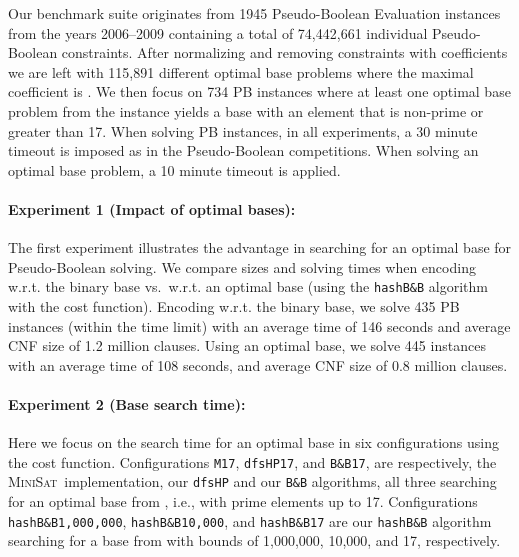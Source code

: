 \documentclass[envcountsame]{llncs}
\newcommand\minisatp{\textsc{MiniSat}}
\begin{document}
Our benchmark suite originates from 1945 Pseudo-Boolean Evaluation
\cite{Manquinho06}
instances from the years 2006--2009 containing a total of 
74,442,661 individual Pseudo-Boolean constraints. After 
normalizing and removing constraints with  coefficients we
are left with 115,891 different optimal base problems where the
maximal coefficient is .
We then focus on 734
PB instances where at least one optimal base
problem from the instance yields a base with an element that is
non-prime or greater than 17.
When solving PB instances, in all experiments, a 30 minute timeout is
imposed as in the Pseudo-Boolean competitions. When solving an optimal
base problem, a 10 minute timeout is applied.


\paragraph{Experiment 1 (Impact of optimal bases):}

The first experiment illustrates the advantage in searching for an
optimal base for Pseudo-Boolean solving. We compare sizes and
solving times when encoding w.r.t. the binary base vs.\ w.r.t. an optimal base
(using the \texttt{hashB\&B} algorithm with the  cost
function).
Encoding w.r.t. the binary base, we solve 435 PB instances (within the
time limit) with an average time of 146 seconds and average CNF size
of 1.2 million clauses.
Using an optimal base, we solve 445 instances with an average time of
108 seconds, and average CNF size of 0.8 million clauses.



\paragraph{Experiment 2 (Base search time):}

Here we focus on the search time for an optimal base in six
configurations using the  cost function.
Configurations \texttt{M17}, \texttt{dfsHP17}, and \texttt{B\&B17},
are respectively, the \minisatp\ implementation, our \texttt{dfsHP}
and our \texttt{B\&B} algorithms, all three searching for an optimal
base from , i.e., with prime elements up to 17.
Configurations \texttt{hashB\&B1,000,000}, \texttt{hashB\&B10,000},
and \texttt{hashB\&B17} are our \texttt{hashB\&B} algorithm 
searching for a base from  with bounds of
 1,000,000,  10,000, and  17, respectively.
\end{document}
